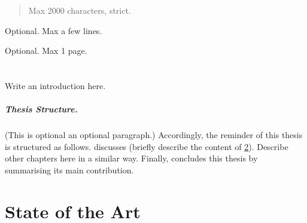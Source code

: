\documentclass[12pt,a4paper,openright,twoside]{book}
\begin{document}
	
\frontmatter



\begin{abstract}	
Max 2000 characters, strict.
\end{abstract}

\begin{dedication} %
Optional. Max a few lines.
\end{dedication}

\begin{acknowledgements} %
Optional. Max 1 page.
\end{acknowledgements}

\tableofcontents   
\listoffigures     %
\lstlistoflistings %

\mainmatter

\chapter{\introductionname}
\label{chap:introduction}

Write an introduction here.

%
\paragraph{Thesis Structure.} %
%

(This is optional an optional paragraph.)
%
Accordingly, the reminder of this thesis is structured as follows.
%
 discusses (briefly describe the content of \cref{chap:background}).
%
Describe other chapters here in a similar way.
%
Finally,  concludes this thesis by summarising its main contribution.

\chapter{State of the Art} %
\label{chap:background}
\end{document}
